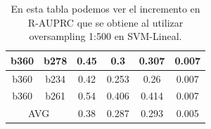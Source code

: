 \begin{table}[ht]
\begin{tabular}{|c|c|c|c|c|c|}
b360                & b278               & 0.45        & 0.3                       & 0.307                     & 0.007         \\ \hline
b360                & b234               & 0.42        & 0.253                     & 0.26                      & 0.007         \\ \hline
b360                & b261               & 0.54        & 0.406                     & 0.414                     & 0.007         \\ \hline
\multicolumn{2}{|c|}{AVG}                & 0.38        & 0.287                     & 0.293                     & 0.005         \\ \hline
\end{tabular}
\caption{En esta tabla podemos ver el incremento en R-AUPRC que se obtiene al utilizar oversampling 1:500 en SVM-Lineal. }
\label{tab:imb_comparison_l} 
\end{table}

